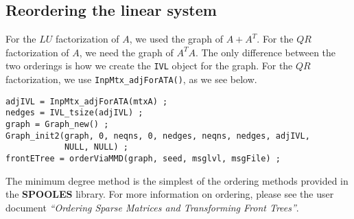 \subsection{Reordering the linear system}
\label{subsection:QR:reordering}
For the $LU$ factorization of $A$, we used the graph of $A + A^T$.
For the $QR$ factorization of $A$, we need the graph of $A^TA$.
The only difference between the two orderings is how we create
the {\tt IVL} object for the graph.
For the $QR$ factorization, we use 
{\tt InpMtx\_adjForATA()}, as we see below.
\begin{verbatim}
adjIVL = InpMtx_adjForATA(mtxA) ;
nedges = IVL_tsize(adjIVL) ;
graph = Graph_new() ;
Graph_init2(graph, 0, neqns, 0, nedges, neqns, nedges, adjIVL,
            NULL, NULL) ;
frontETree = orderViaMMD(graph, seed, msglvl, msgFile) ;
\end{verbatim}
The minimum degree method is the simplest of the ordering methods
provided in the {\bf SPOOLES} library.
For more information on ordering, please see the user document
{\it ``Ordering Sparse Matrices and Transforming Front Trees''}.
\par
